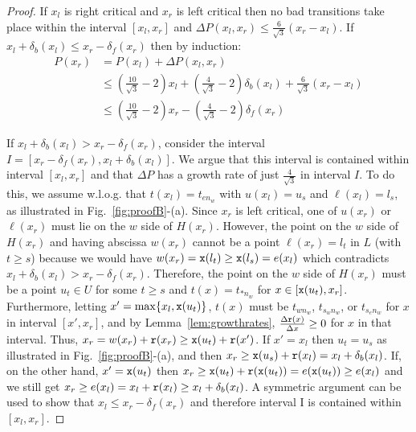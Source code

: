\begin{proof}
 If $x_l$ is right critical and $x_r$ is left critical then no bad transitions
take place within the interval $[x_l,x_r]$ and
$\Delta P(x_l,x_r) \leq \frac{6}{\sqrt{3}}(x_r-x_l)$. If $x_l+\delta_b(x_l) \leq x_r-\delta_f(x_r)$ then by induction:
\begin{align*}
	P(x_r) & = P(x_l) + \Delta P(x_l,x_r) \\
               & \leq \left(\frac{10}{\sqrt{3}}-2\right)x_l+\left(\frac{4}{\sqrt{3}}-2\right)\delta_b(x_l)
	       + \frac{6}{\sqrt{3}}(x_r-x_l) \\
               & \leq \left(\frac{10}{\sqrt{3}}-2\right)x_r-\left(\frac{4}{\sqrt{3}}-2\right)\delta_f(x_r)
\end{align*}

If $x_l+\delta_b(x_l) > x_r-\delta_f(x_r)$, consider the interval
$I = [x_r-\delta_f(x_r), x_l+\delta_b(x_l)]$.
We argue that this interval
is contained within interval $[x_l, x_r]$ and that $\Delta P$ has a growth
rate of just $\frac{4}{\sqrt{3}}$ in interval $I$. To do
this, we assume w.l.o.g. that $t(x_l) = t_{en_w}$ with $u(x_l) = u_s$ and
$\ell(x_l) = l_s$, as illustrated in Fig.~\ref{fig:proofB}-(a). %
Since $x_r$ is left critical, one of $u(x_r)$ or $\ell(x_r)$ must lie on the
$w$ side of $H(x_r)$. However, the point on the $w$ side of $H(x_r)$ and 
having abscissa $w(x_r)$ cannot be a point $\ell(x_r) = l_t$ in $L$ 
(with $t \geq s$) because %
we would have
$w(x_r) = {\tt x}(l_t) \geq {\tt x}(l_s) = e(x_l)$ which contradicts 
$x_l+\delta_b(x_l) > x_r-\delta_f(x_r)$.
%
Therefore, the point on the $w$ side of $H(x_r)$ must be 
a point $u_t \in U$ for some $t \geq s$ and $t(x) = t_{\ast n_w}$ for $x \in
[{\tt x}(u_t),x_r]$.  Furthermore, letting $x' = \max\{x_l, {\tt x}(u_t)\}$,
$t(x)$ must be $t_{wn_w}$, $t_{s_wn_w}$, or $t_{s_en_w}$ for $x$ in interval
$[x',x_r]$, and by
Lemma~\ref{lem:growthrates}, $\frac{\Delta {\tt r}(x)}{\Delta x} \geq 0$ for
$x$ in that interval. Thus, $x_r = w(x_r) + {\tt r}(x_r) \geq {\tt x}(u_t) + {\tt r }(x')$.
%
If $x' = x_l$ then $u_t = u_s$ as illustrated in Fig.~\ref{fig:proofB}-(a), and
then $x_r \geq {\tt x}(u_s) + {\tt r}(x_l) = x_l + \delta_b(x_l)$. 
%
If, on the other hand, $x' = {\tt x}(u_t)$ then $x_r \geq {\tt x}(u_t) + {\tt r}({\tt x}(u_t)) = e({\tt x}(u_t)) \geq e(x_l)$ %
and we still get $x_r \geq e(x_l) = x_l + {\tt r}(x_l) \geq x_l + \delta_b(x_l)$. 
%
A symmetric argument can be used to show
that $x_l \leq x_r-\delta_f(x_r)$ and therefore interval I is contained within
$[x_l,x_r]$.


\end{proof}
